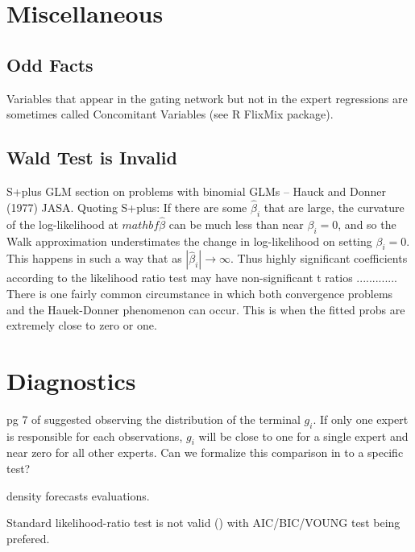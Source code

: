 \documentclass[12pt]{article}
\begin{document}
\section{Miscellaneous}

\subsection{Odd Facts}

Variables that appear in the gating network but not in the expert regressions
are sometimes called Concomitant Variables (see R FlixMix package).

\subsection{Wald Test is Invalid}
S+plus GLM section on problems with binomial GLMs
  -- Hauck and Donner (1977) JASA. Quoting S+plus: If there are
  some $\hat{\beta}_{i}$ that are large, the curvature of the log-likelihood at
  $mathbf{\hat{\beta}}$ can be much less than near $\beta_{i}=0$, and so the Walk
  approximation understimates the change in log-likelihood on setting $\beta_{i}=0$.
  This happens in such a way that as $|\hat{\beta}_{i}| \rightarrow \infty$. Thus
  highly significant coefficients according to the likelihood ratio test may have
  non-significant t ratios ............. There is one fairly common circumstance
  in which both convergence problems and the Hauek-Donner phenomenon can occur.
  This is when the fitted probs are extremely close to zero or one.



\section{Diagnostics}
pg 7 of \cite{WMS1995} suggested observing the distribution of the terminal
$g_{i}$. If only one expert is responsible for each observations, $g_{i}$ will
be close to one for a single expert and near zero for all other experts.
Can we formalize this comparison in to a specific test?

density forecasts evaluations.

Standard likelihood-ratio test is not valid (\cite{CarvalhoTanner2006}) with
AIC/BIC/VOUNG test being prefered.



\printbibliography
\end{document}
